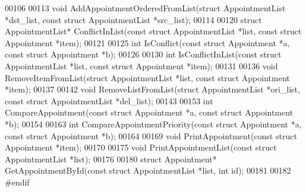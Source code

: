 \begin{DoxyCode}
00106 
00113 \textcolor{keywordtype}{void} AddAppointmentOrderedFromList(\textcolor{keyword}{struct} AppointmentList *dst\_list, \textcolor{keyword}{const} \textcolor{keyword}{struct} 
      AppointmentList *src\_list);
00114 
00120 \textcolor{keyword}{struct }AppointmentList* ConflictInList(\textcolor{keyword}{const} \textcolor{keyword}{struct} AppointmentList *list, \textcolor{keyword}{const} \textcolor{keyword}{struct} 
      Appointment *item);
00121 
00125 \textcolor{keywordtype}{int} IsConflict(\textcolor{keyword}{const} \textcolor{keyword}{struct} Appointment *a, \textcolor{keyword}{const} \textcolor{keyword}{struct} Appointment *b);
00126 
00130 \textcolor{keywordtype}{int} IsConflictInList(\textcolor{keyword}{const} \textcolor{keyword}{struct} AppointmentList *list, \textcolor{keyword}{const} \textcolor{keyword}{struct} 
      Appointment *item);
00131 
00136 \textcolor{keywordtype}{void} RemoveItemFromList(\textcolor{keyword}{struct} AppointmentList *list, \textcolor{keyword}{const} \textcolor{keyword}{struct} Appointment *item);
00137 
00142 \textcolor{keywordtype}{void} RemoveListFromList(\textcolor{keyword}{struct} AppointmentList *ori\_list, \textcolor{keyword}{const} \textcolor{keyword}{struct} 
      AppointmentList *del\_list);
00143 
00153 \textcolor{keywordtype}{int} CompareAppointment(\textcolor{keyword}{const} \textcolor{keyword}{struct} Appointment *a, \textcolor{keyword}{const} \textcolor{keyword}{struct} Appointment *b);
00154 
00163 \textcolor{keywordtype}{int} CompareAppointmentPriority(\textcolor{keyword}{const} \textcolor{keyword}{struct} Appointment *a, \textcolor{keyword}{const} \textcolor{keyword}{struct} 
      Appointment *b);
00164 
00169 \textcolor{keywordtype}{void} PrintAppointment(\textcolor{keyword}{const} \textcolor{keyword}{struct} Appointment *item);
00170 
00175 \textcolor{keywordtype}{void} PrintAppointmentList(\textcolor{keyword}{const} \textcolor{keyword}{struct} AppointmentList *list);
00176 
00180 \textcolor{keyword}{struct }Appointment* GetAppointmentById(\textcolor{keyword}{const} \textcolor{keyword}{struct} AppointmentList *list, \textcolor{keywordtype}{int} \textcolor{keywordtype}{id});
00181 
00182 \textcolor{preprocessor}{#endif}
\end{DoxyCode}
